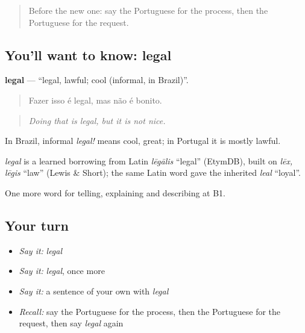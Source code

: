 \label{lesson:PT-C385-legal}



\begin{quote}
Before the new one: say the Portuguese for the process, then the Portuguese for the request.
\end{quote}

\subsection*{You'll want to know: legal}
\textbf{legal} — \textquotedblleft{}legal, lawful; cool (informal, in Brazil)\textquotedblright{}.

\begin{quote}
Fazer isso é legal, mas não é bonito.
\end{quote}

\begin{quote}
\emph{Doing that is legal, but it is not nice.}
\end{quote}

In Brazil, informal \emph{legal!} means cool, great; in Portugal it is mostly lawful.

\begin{cousinweb}
\emph{legal} is a learned borrowing from Latin \emph{lēgālis} \textquotedblleft{}legal\textquotedblright{} (EtymDB), built on \emph{lēx, lēgis} \textquotedblleft{}law\textquotedblright{} (Lewis \& Short); the same Latin word gave the inherited \emph{leal} \textquotedblleft{}loyal\textquotedblright{}.
\end{cousinweb}

\begin{grammarlens}[title={What you've built}]
One more word for telling, explaining and describing at B1.
\end{grammarlens}

\subsection*{Your turn}
\begin{itemize}
\raggedright
  \item \emph{Say it:} \emph{legal}
  \item \emph{Say it:} \emph{legal}, once more
  \item \emph{Say it:} a sentence of your own with \emph{legal}
  \item \emph{Recall:} say the Portuguese for the process, then the Portuguese for the request, then say \emph{legal} again
\end{itemize}

